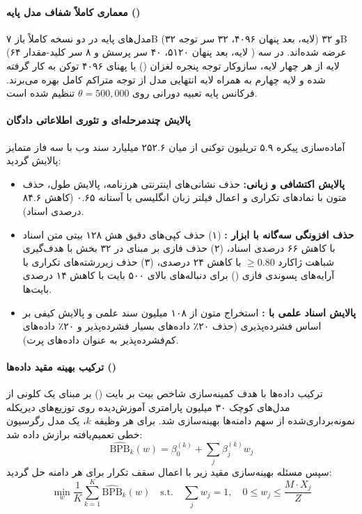 \item {}

\paragraph*{معماری کاملاً شفاف مدل پایه ()}
مدل‌های پایه  \cite{olmo3_2025} در دو نسخه کاملاً باز ۷B (۳۲ لایه، بعد پنهان ۴۰۹۶، ۳۲ سر توجه) و ۳۲B (۶۴ لایه، بعد پنهان ۵۱۲۰، ۴۰ سر پرسش و ۸ سر کلید-مقدار ) عرضه شده‌اند. در سه لایه از هر چهار لایه، سازوکار توجه پنجره لغزان () با پهنای ۴۰۹۶ توکن به کار گرفته شده و لایه چهارم به همراه لایه انتهایی مدل از توجه متراکم کامل بهره می‌برند. فرکانس پایه تعبیه دورانی روی $\theta = 500,000$ تنظیم شده است.

\paragraph*{پالایش چندمرحله‌ای و تئوری اطلاعاتی دادگان }
آماده‌سازی پیکره ۵.۹ تریلیون توکنی  از میان ۲۵۲.۶ میلیارد سند وب با سه فاز متمایز پالایش گردید:
\begin{itemize}
    \item \textbf{پالایش اکتشافی و زبانی:} حذف نشانی‌های اینترنتی هرزنامه، پالایش طول، حذف متون با نمادهای تکراری و اعمال فیلتر زبان انگلیسی  با آستانه ۰.۶۵ (کاهش ۸۴.۶ درصدی اسناد).
    \item \textbf{حذف افزونگی سه‌گانه با ابزار :} (۱) حذف کپی‌های دقیق هش ۱۲۸ بیتی متن اسناد با کاهش ۶۶ درصدی اسناد، (۲) حذف فازی بر مبنای  در ۳۲ بخش با هدف‌گیری شباهت ژاکارد $\ge 0.80$ با کاهش ۲۴ درصدی، (۳) حذف زیررشته‌های تکراری با آرایه‌های پسوندی فازی () برای دنباله‌های بالای ۵۰۰ بایت با کاهش ۱۴ درصدی بایت‌ها.
    \item \textbf{پالایش اسناد علمی با :} استخراج متون از ۱۰۸ میلیون سند علمی  و پالایش کیفی بر اساس فشرده‌پذیری  (حذف ۲۰٪ داده‌های بسیار فشرده‌پذیر و ۲۰٪ داده‌های کم‌فشرده‌پذیر به عنوان داده‌های پرت).
\end{itemize}

\paragraph*{ترکیب بهینه مقید داده‌ها ()}
ترکیب داده‌ها با هدف کمینه‌سازی شاخص بیت بر بایت () بر مبنای یک کلونی از مدل‌های کوچک ۳۰ میلیون پارامتری آموزش‌دیده روی توزیع‌های دیریکله نمونه‌برداری‌شده از سهم دامنه‌ها بهینه‌سازی شد. برای هر وظیفه $k$، یک مدل رگرسیون خطی تعمیم‌یافته برازش داده شد:
\begin{equation}
    \widehat{\text{BPB}}_k(w) = \beta_0^{(k)} + \sum_j \beta_j^{(k)} w_j
\end{equation}
سپس مسئله بهینه‌سازی مقید زیر با اعمال سقف تکرار برای هر دامنه حل گردید:
\begin{equation}
    \min_w \frac{1}{K} \sum_{k=1}^K \widehat{\text{BPB}}_k(w) \quad \text{s.t.} \quad \sum_j w_j = 1, \quad 0 \le w_j \le \frac{M \cdot X_j}{Z}
\end{equation}

